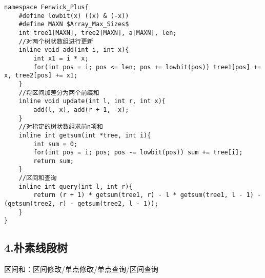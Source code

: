 \documentclass[]{article}
\begin{document}
\begin{verbatim}
namespace Fenwick_Plus{
    #define lowbit(x) ((x) & (-x))
    #define MAXN $Array_Max_Sizes$
    int tree1[MAXN], tree2[MAXN], a[MAXN], len;
    //对两个树状数组进行更新
    inline void add(int i, int x){
        int x1 = i * x;
        for(int pos = i; pos <= len; pos += lowbit(pos)) tree1[pos] += x, tree2[pos] += x1;
    }
    //将区间加差分为两个前缀和
    inline void update(int l, int r, int x){
        add(l, x), add(r + 1, -x);
    }
    //对指定的树状数组求前n项和
    inline int getsum(int *tree, int i){
        int sum = 0;
        for(int pos = i; pos; pos -= lowbit(pos)) sum += tree[i];
        return sum;
    }
    //区间和查询
    inline int query(int l, int r){
        return (r + 1) * getsum(tree1, r) - l * getsum(tree1, l - 1) - (getsum(tree2, r) - getsum(tree2, l - 1));
    }
}
\end{verbatim}

\hypertarget{ux6734ux7d20ux7ebfux6bb5ux6811}{%
\subsection{4.朴素线段树}\label{ux6734ux7d20ux7ebfux6bb5ux6811}}

区间和：区间修改/单点修改/单点查询/区间查询
\end{document}
